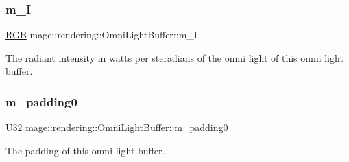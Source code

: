 \subsubsection{\texorpdfstring{m\+\_\+I}{m\_I}}
{\footnotesize\ttfamily \mbox{\hyperlink{structmage_1_1_r_g_b}{R\+GB}} mage\+::rendering\+::\+Omni\+Light\+Buffer\+::m\+\_\+I}

The radiant intensity in watts per steradians of the omni light of this omni light buffer. \mbox{\label{structmage_1_1rendering_1_1_omni_light_buffer_a3b440492e1a9fc48c6f109e5787aa4c7}} 
\subsubsection{\texorpdfstring{m\+\_\+padding0}{m\_padding0}}
{\footnotesize\ttfamily \mbox{\hyperlink{namespacemage_a41c104c036fba3756a74e19f793eeaa1}{U32}} mage\+::rendering\+::\+Omni\+Light\+Buffer\+::m\+\_\+padding0}

The padding of this omni light buffer. 